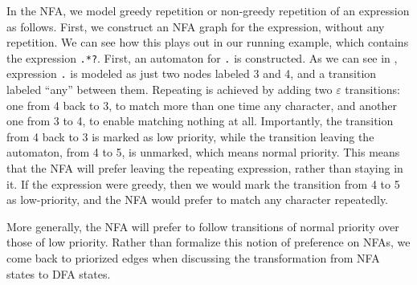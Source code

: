 \documentclass[english]{sigplanconf}
\theoremstyle{definition}
\begin{document}
In the NFA, we model greedy repetition or non-greedy repetition of
an expression as follows.  First, we construct an NFA graph for the
expression, without any repetition.  We can see how this plays out
in our running example, which contains the expression \texttt{.*?}.
First, an automaton for \texttt{.} is constructed.  As we can see
in , expression \texttt{.} is modeled as
just two nodes labeled 3 and 4, and a transition labeled ``any''
between them.  Repeating is achieved by adding two $\varepsilon$
transitions: one from 4 back to 3, to match more than one time any
character, and another one from 3 to 4, to enable matching nothing
at all.  Importantly, the transition from 4 back to 3 is marked as
low priority, while the transition leaving the automaton, from 4
to 5, is unmarked, which means normal priority.  This means that
the NFA will prefer leaving the repeating expression, rather than
staying in it.  If the expression were greedy, then we would mark
the transition from 4 to 5 as low-priority, and the NFA would prefer
to match any character repeatedly.

More generally, the NFA will prefer to follow transitions of normal
priority over those of low priority. Rather than formalize this
notion of preference on NFAs, we come back to priorized edges when
discussing the transformation from NFA states to DFA states.
\end{document}
